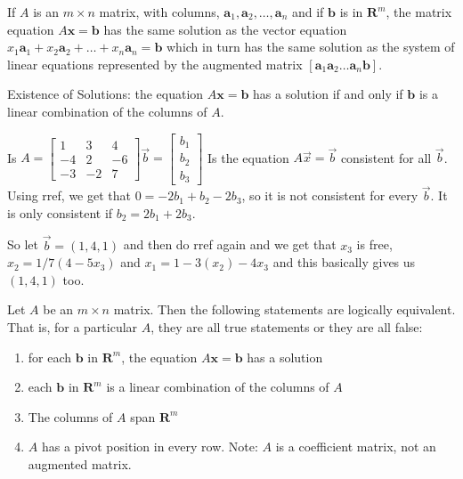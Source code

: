 \documentclass[../linalg.tex]{subfiles}
\begin{document}
\begin{theorem}
    If $A$ is an $m\times n$ matrix, with columns, $\textbf{a}_1,\textbf{a}_2,\dots,\textbf{a}_n$ and if $\textbf{b}$ is in $\textbf{R}^m$, the matrix equation 
    $A\textbf{x}=\textbf{b}$ has the same solution as the vector equation $x_1\textbf{a}_1+x_2\textbf{a}_2+\dots+x_n\textbf{a}_n=\textbf{b}$ which in turn has the same solution 
    as the system of linear equations represented by the augmented matrix $[\textbf{a}_1 \textbf{a}_2\dots \textbf{a}_n \textbf{b}]$.
\end{theorem}

Existence of Solutions: the equation $A\textbf{x}=\textbf{b}$ has a solution if and only if $\textbf{b}$ is a linear combination of the columns of $A$.

\begin{example}
    Is $A=\begin{bmatrix}
        1 & 3 & 4 \\ 
        -4 & 2 & -6 \\ 
        -3 & -2 & 7
    \end{bmatrix} \vec{b}=\begin{bmatrix}
        b_1 \\ b_2 \\ b_3
    \end{bmatrix}$ Is the equation $A\vec{x}=\vec{b}$ consistent for all $\vec{b}$. Using rref, we get that $0=-2b_1+b_2-2b_3$, so it is not consistent for every $\vec{b}$. It is only consistent if $b_2=2b_1+2b_3$.

So let $\vec{b}=(1,4,1)$ and then do rref again and we get that $x_3$ is free, $x_2=1/7(4-5x_3)$ and $x_1=1-3(x_2)-4x_3$ and this basically gives us $(1,4,1)$ too.
\end{example}

\begin{theorem}[Existence of soultion for $A\textbf{x}=\textbf{b}$]
    Let $A$ be an $m\times n$ matrix. Then the following statements are logically equivalent. That is, for a particular $A$, they are all true statements or they are all false:
    \begin{enumerate}
        \item for each $\textbf{b}$ in $\textbf{R}^m$, the equation $A\textbf{x}=\textbf{b}$ has a solution 
        \item each $\textbf{b}$ in $\textbf{R}^m$ is a linear combination of the columns of $A$
        \item The columns of $A$ span $\textbf{R}^m$
        \item $A$ has a pivot position in every row. Note: $A$ is a coefficient matrix, not an augmented matrix.
    \end{enumerate}
\end{theorem}
\end{document}
